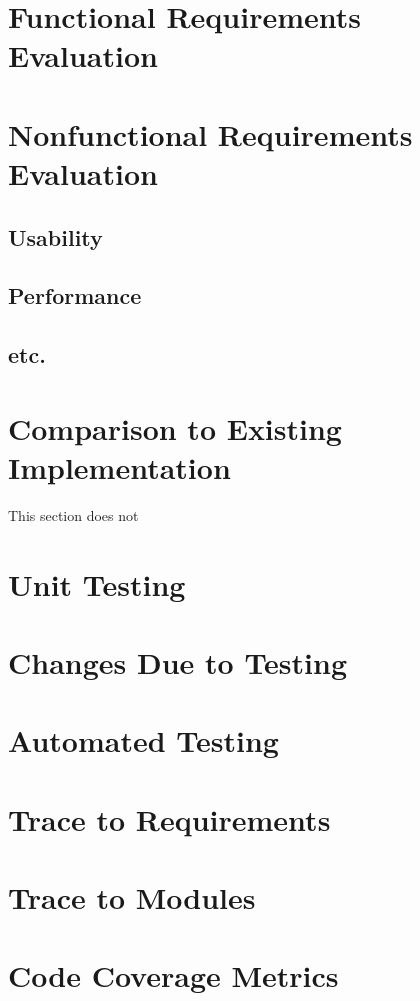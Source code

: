 \documentclass[12pt, titlepage]{article}
\begin{document}
\section{Functional Requirements Evaluation}

\section{Nonfunctional Requirements Evaluation}

\subsection{Usability}
		
\subsection{Performance}

\subsection{etc.}
	
\section{Comparison to Existing Implementation}	

This section does not 

\section{Unit Testing}

\section{Changes Due to Testing}

\section{Automated Testing}
		
\section{Trace to Requirements}
		
\section{Trace to Modules}		

\section{Code Coverage Metrics}




\end{document}
